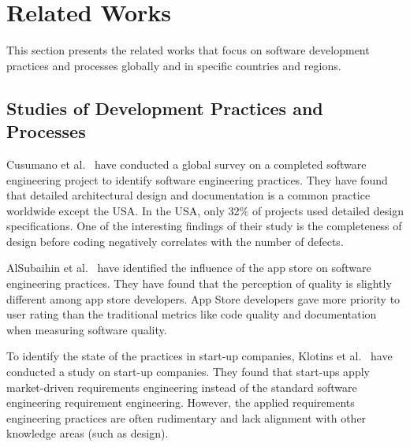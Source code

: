 \section{Related Works}
\label{related_works}
This section presents the related works that focus on software development practices and processes globally and in specific countries and regions.  

\subsection{Studies of Development Practices and Processes}
\label{dev practice study}
Cusumano et al.~\cite{Cusumano2003} have conducted a global survey on a completed software engineering project to identify software engineering practices. They have found that detailed architectural design and documentation is a common practice worldwide except the USA. In the USA, only 32\% of projects used detailed design specifications. One of the interesting findings of their study is the completeness of design before coding negatively correlates with the number of defects.

AlSubaihin et al.~\cite{AlSubaihin2019} have identified the influence of the app store on software engineering practices. They have found that the perception of quality is slightly different among app store developers. App Store developers gave more priority to user rating than the traditional metrics like code quality and documentation when measuring software quality.

To identify the state of the practices in start-up companies, Klotins et al.~\cite{Klotins2018} have conducted a study on start-up companies. They found that start-ups apply market-driven requirements engineering instead of the standard software engineering requirement engineering. However, the applied requirements engineering practices are often rudimentary and lack alignment with other knowledge areas (such as design).

